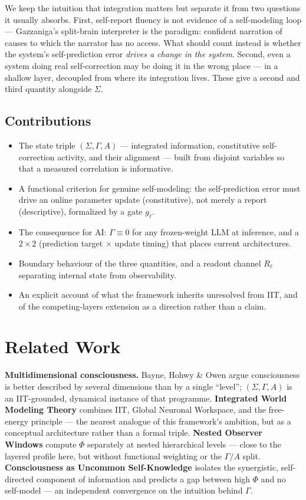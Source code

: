 \documentclass[11pt]{article}
\begin{document}
We keep the intuition that integration matters but separate it from two questions it usually absorbs. First, self-report fluency is not evidence of a self-modeling loop --- Gazzaniga's split-brain interpreter is the paradigm: confident narration of causes to which the narrator has no access. What should count instead is whether the system's self-prediction error \emph{drives a change in the system}. Second, even a system doing real self-correction may be doing it in the wrong place --- in a shallow layer, decoupled from where its integration lives. These give a second and third quantity alongside $\Sigma$.

\subsection*{Contributions}
\begin{itemize}[leftmargin=*]
\item The state triple $(\Sigma,\Gamma,A)$ --- integrated information, constitutive self-correction activity, and their alignment --- built from disjoint variables so that a measured correlation is informative.
\item A functional criterion for genuine self-modeling: the self-prediction error must drive an online parameter update (constitutive), not merely a report (descriptive), formalized by a gate $g_\ell$.
\item The consequence for AI: $\Gamma\equiv0$ for any frozen-weight LLM at inference, and a $2\times2$ (prediction target $\times$ update timing) that places current architectures.
\item Boundary behaviour of the three quantities, and a readout channel $R_\ell$ separating internal state from observability.
\item An explicit account of what the framework inherits unresolved from IIT, and of the competing-layers extension as a direction rather than a claim.
\end{itemize}

\section{Related Work}

\textbf{Multidimensional consciousness.} Bayne, Hohwy \& Owen \cite{bayne2016} argue consciousness is better described by several dimensions than by a single ``level''; $(\Sigma,\Gamma,A)$ is an IIT-grounded, dynamical instance of that programme. \textbf{Integrated World Modeling Theory} \cite{safron2020} combines IIT, Global Neuronal Workspace, and the free-energy principle --- the nearest analogue of this framework's ambition, but as a conceptual architecture rather than a formal triple. \textbf{Nested Observer Windows} \cite{riddle2024} compute $\Phi$ separately at nested hierarchical levels --- close to the layered profile here, but without functional weighting or the $\Gamma/A$ split. \textbf{Consciousness as Uncommon Self-Knowledge} \cite{usk2026} isolates the synergistic, self-directed component of information and predicts a gap between high $\Phi$ and no self-model --- an independent convergence on the intuition behind $\Gamma$.
\end{document}
